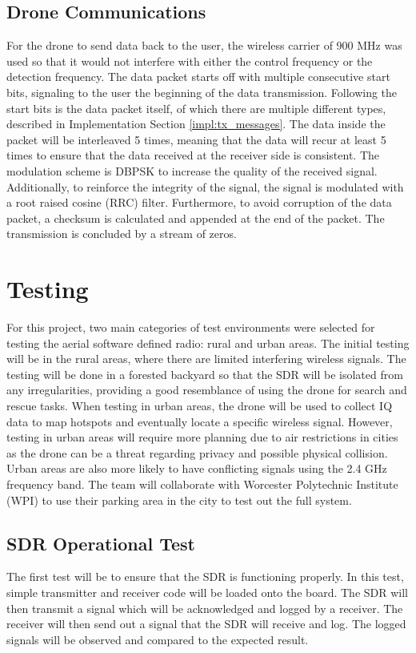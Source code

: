 \subsection{Drone Communications}
For the drone to send data back to the user, the wireless carrier of 900 MHz was used so that it would not interfere with either the control frequency or the detection frequency. The data packet starts off with multiple consecutive start bits, signaling to the user the beginning of the data transmission. Following the start bits is the data packet itself, of which there are multiple different types, described in Implementation Section \ref{impl:tx_messages}. The data inside the packet will be interleaved 5 times, meaning that the data will recur at least 5 times to ensure that the data received at the receiver side is consistent. The modulation scheme is DBPSK to increase the quality of the received signal. Additionally, to reinforce the integrity of the signal, the signal is modulated with a root raised cosine (RRC) filter. Furthermore, to avoid corruption of the data packet, a checksum is calculated and appended at the end of the packet. The transmission is concluded by a stream of zeros. \par

\section{Testing}
For this project, two main categories of test environments were selected for testing the aerial software defined radio: rural and urban areas. The initial testing will be in the rural areas, where there are limited interfering wireless signals. The testing will be done in a forested backyard so that the SDR will be isolated from any irregularities, providing a good resemblance of using the drone for search and rescue tasks. When testing in urban areas, the drone will be used to collect IQ data to map hotspots and eventually locate a specific wireless signal. However, testing in urban areas will require more planning due to air restrictions in cities as the drone can be a threat regarding privacy and possible physical collision. Urban areas are also more likely to have conflicting signals using the 2.4 GHz frequency band. The team will collaborate with Worcester Polytechnic Institute (WPI) to use their parking area in the city to test out the full system. \par
 
\subsection{SDR Operational Test}
The first test will be to ensure that the SDR is functioning properly. In this test, simple transmitter and receiver code will be loaded onto the board. The SDR will then transmit a signal which will be acknowledged and logged by a receiver. The receiver will then send out a signal that the SDR will receive and log. The logged signals will be observed and compared to the expected result. \par 

